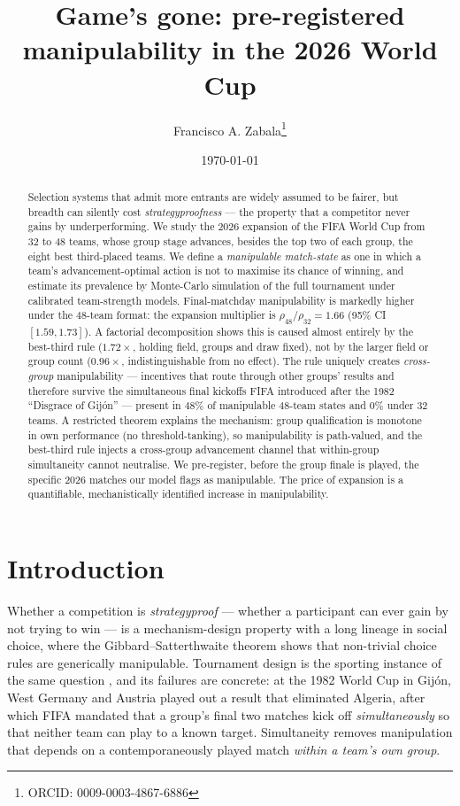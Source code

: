 \documentclass[11pt]{article}
\title{\bfseries Game's gone: pre-registered manipulability in the 2026 World Cup}
\author[1]{Francisco A. Zabala\thanks{ORCID: 0009-0003-4867-6886}}
\affil[1]{California Institute of Technology}
\date{\today}
\begin{document}
\maketitle
\linenumbers

\begin{abstract}
\noindent
Selection systems that admit more entrants are widely assumed to be fairer, but breadth can
silently cost \emph{strategyproofness} --- the property that a competitor never gains by
underperforming. We study the 2026 expansion of the FIFA World Cup from 32 to 48 teams, whose
group stage advances, besides the top two of each group, the eight best third-placed teams. We
define a \emph{manipulable match-state} as one in which a team's advancement-optimal action is not
to maximise its chance of winning, and estimate its prevalence by Monte-Carlo simulation of the
full tournament under calibrated team-strength models. Final-matchday manipulability is markedly
higher under the 48-team format: the expansion multiplier is
$\rho_{48}/\rho_{32}=1.66$ (95\% CI $[1.59,1.73]$). A factorial decomposition shows this is caused
almost entirely by the best-third rule ($1.72\times$, holding field, groups and draw fixed), not by
the larger field or group count ($0.96\times$, indistinguishable from no effect). The rule uniquely
creates \emph{cross-group} manipulability --- incentives that route through other groups' results and
therefore survive the simultaneous final kickoffs FIFA introduced after the 1982 ``Disgrace of
Gij\'on'' --- present in $48\%$ of manipulable 48-team states and $0\%$ under 32 teams. A restricted
theorem explains the mechanism: group qualification is monotone in own performance (no
threshold-tanking), so manipulability is path-valued, and the best-third rule injects a cross-group
advancement channel that within-group simultaneity cannot neutralise. We pre-register, before the
group finale is played, the specific 2026 matches our model flags as manipulable. The price of
expansion is a quantifiable, mechanistically identified increase in manipulability.
\end{abstract}

\section*{Introduction}
Whether a competition is \emph{strategyproof} --- whether a participant can ever gain by not
trying to win --- is a mechanism-design property with a long lineage in social choice, where the
Gibbard--Satterthwaite theorem \cite{gibbard1973,satterthwaite1975} shows that non-trivial choice
rules are generically manipulable. Tournament design is the sporting instance of the same question
\cite{csato2021tournament,kendall2017sportsrules}, and its failures are concrete: at the 1982 World
Cup in Gij\'on, West Germany and Austria played out a result that eliminated Algeria, after which
FIFA mandated that a group's final two matches kick off \emph{simultaneously} so that neither team
can play to a known target. Simultaneity removes manipulation that depends on a contemporaneously
played match \emph{within a team's own group}.
\end{document}
